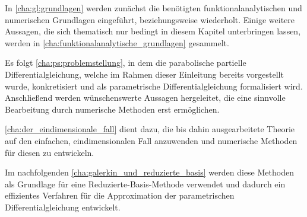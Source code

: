 In \cref{cha:gl:grundlagen} werden zunächst die benötigten funktionalanalytischen und numerischen Grundlagen eingeführt, beziehungsweise wiederholt.
Einige weitere Aussagen, die sich thematisch nur bedingt in diesem Kapitel unterbringen lassen, werden in \cref{cha:funktionalanalytische_grundlagen} gesammelt.

Es folgt \cref{cha:ps:problemstellung}, in dem die parabolische partielle Differentialgleichung, welche im Rahmen dieser Einleitung bereits vorgestellt wurde, konkretisiert und als parametrische Differentialgleichung formalisiert wird.
Anschließend werden wünschenswerte Aussagen hergeleitet, die eine sinnvolle Bearbeitung durch numerische Methoden erst ermöglichen.

\cref{cha:der_eindimensionale_fall} dient dazu, die bis dahin ausgearbeitete Theorie auf den einfachen, eindimensionalen Fall anzuwenden und numerische Methoden für diesen zu entwickeln.

Im nachfolgenden \cref{cha:galerkin_und_reduzierte_basis} werden diese Methoden als Grundlage für eine Reduzierte-Basis-Methode verwendet und dadurch ein effizientes Verfahren für die Approximation der parametrischen Differentialgleichung entwickelt.


